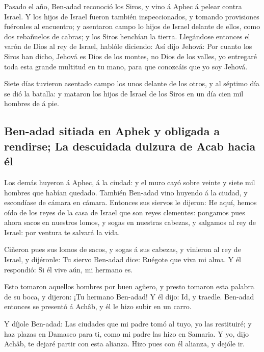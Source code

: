  Pasado el año, Ben-adad reconoció los Siros, y vino á
Aphec á pelear contra Israel.  Y los hijos de Israel
fueron también inspeccionados, y tomando provisiones fuéronles al
encuentro; y asentaron campo lo hijos de Israel delante de ellos, como
dos rebañuelos de cabras; y los Siros henchían la tierra.
 Llegándose entonces el varón de Dios al rey de Israel,
hablóle diciendo: Así dijo Jehová: Por cuanto los Siros han dicho,
Jehová es Dios de los montes, no Dios de los valles, yo entregaré toda
esta grande multitud en tu mano, para que conozcáis que yo soy Jehová.

 Siete días tuvieron asentado campo los unos delante de
los otros, y al séptimo día se dió la batalla: y mataron los hijos de
Israel de los Siros en un día cien mil hombres de á pie.

\hypertarget{ben-adad-sitiada-en-aphek-y-obligada-a-rendirse-la-descuidada-dulzura-de-acab-hacia-uxe9l}{%
\subsection{Ben-adad sitiada en Aphek y obligada a rendirse; La
descuidada dulzura de Acab hacia
él}\label{ben-adad-sitiada-en-aphek-y-obligada-a-rendirse-la-descuidada-dulzura-de-acab-hacia-uxe9l}}

 Los demás huyeron á Aphec, á la ciudad: y el muro cayó
sobre veinte y siete mil hombres que habían quedado. También Ben-adad
vino huyendo á la ciudad, y escondíase de cámara en cámara.
 Entonces sus siervos le dijeron: He aquí, hemos oído de
los reyes de la casa de Israel que son reyes clementes: pongamos pues
ahora sacos en nuestros lomos, y sogas en nuestras cabezas, y salgamos
al rey de Israel: por ventura te salvará la vida.

 Ciñeron pues sus lomos de sacos, y sogas á sus cabezas,
y vinieron al rey de Israel, y dijéronle: Tu siervo Ben-adad dice:
Ruégote que viva mi alma. Y él respondió: Si él vive aún, mi hermano es.

 Esto tomaron aquellos hombres por buen agüero, y presto
tomaron esta palabra de su boca, y dijeron: ¡Tu hermano Ben-adad! Y él
dijo: Id, y traedle. Ben-adad entonces se presentó á Achâb, y él le hizo
subir en un carro.

 Y díjole Ben-adad: Las ciudades que mi padre tomó al
tuyo, yo las restituiré; y haz plazas en Damasco para ti, como mi padre
las hizo en Samaria. Y yo, dijo Achâb, te dejaré partir con esta
alianza. Hizo pues con él alianza, y dejóle ir.


